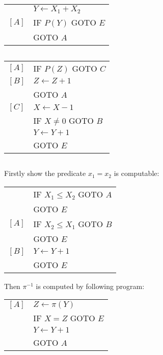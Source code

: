 \subsection{}
\begin{center}
\begin{tabular}{ll}
        & $ Y \gets X_{1} + X_{2} $ \\
  $[A]$ & IF $ P (Y) $ GOTO $E$ \\
        & GOTO $A$ \\
\end{tabular}
\end{center}


\subsection{}
\begin{center}
\begin{tabular}{ll}
  $[A]$ & IF $ P (Z) $ GOTO $C$ \\
  $[B]$ & $ Z \gets Z + 1 $ \\
        & GOTO $A$ \\
  $[C]$ & $ X \gets X - 1 $ \\
        & IF $ X \neq 0 $ GOTO $B$ \\
        & $ Y \gets Y + 1 $  \\
        & GOTO $E$ \\
\end{tabular}
\end{center}


\subsection{}
Firstly show the predicate $ x_{1} = x_{2} $ is computable:
\begin{center}
\begin{tabular}{ll}
        & IF $ X_{1} \le X_{2} $ GOTO $A$ \\
        & GOTO $E$ \\
  $[A]$ & IF $ X_{2} \le X_{1} $ GOTO $B$ \\
        & GOTO $E$ \\
  $[B]$ & $ Y \gets Y + 1 $ \\
        & GOTO $E$ \\
\end{tabular}
\end{center}
Then $\pi^{-1}$ is computed by following program:
\begin{center}
\begin{tabular}{ll}
  $[A]$ & $ Z \gets \pi(Y)$ \\
        & IF $ X = Z $ GOTO $E$ \\
        & $ Y \gets Y + 1 $ \\
        & GOTO $A$ \\
\end{tabular}
\end{center}


